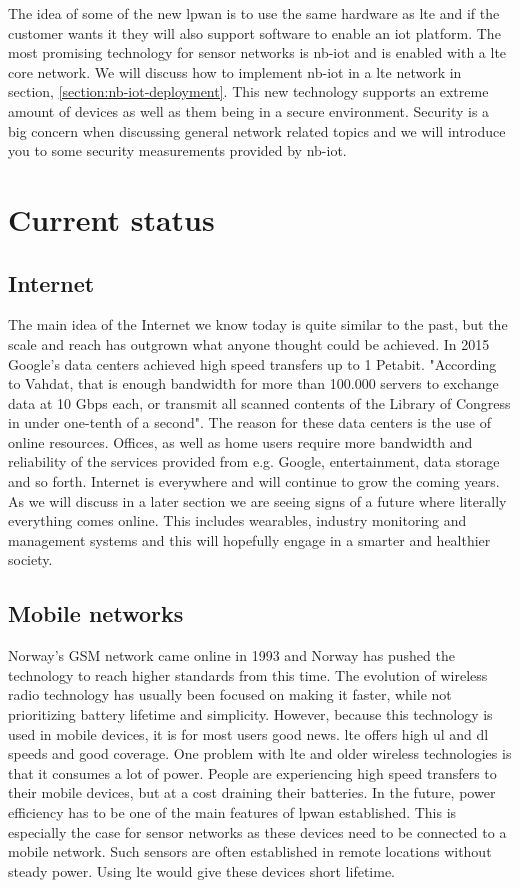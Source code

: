 \documentclass[USenglish]{ifimaster}  %
\begin{document}
The idea of some of the new \acrshort{lpwan} is to use the same hardware as \acrshort{lte} and if the customer wants it they will also support software to enable an \acrshort{iot} platform. The most promising technology for sensor networks is \acrshort{nb-iot} and is enabled with a \acrshort{lte} core network. We will discuss how to implement \acrshort{nb-iot} in a \acrshort{lte} network in section, \vref{section:nb-iot-deployment}. This new technology supports an extreme amount of devices as well as them being in a secure environment. Security is a big concern when discussing general network related topics and we will introduce you to some security measurements provided by \acrshort{nb-iot}.

\section{Current status}
\subsection{Internet}
The main idea of the Internet we know today is quite similar to the past, but the scale and reach has outgrown what anyone thought could be achieved. In 2015 Google's data centers achieved high speed transfers up to 1 Petabit. "According to Vahdat, that is enough bandwidth for more than 100.000 servers to exchange data at 10 Gbps each, or transmit all scanned contents of the Library of Congress in under one-tenth of a second"\cite{online:petabitGoogle}. The reason for these data centers is the use of online resources. Offices, as well as home users require more bandwidth and reliability of the services provided from e.g. Google, entertainment, data storage and so forth.
Internet is everywhere and will continue to grow the coming years. As we will discuss in a later section we are seeing signs of a future where literally everything comes online. This includes wearables, industry monitoring and management systems and this will hopefully engage in a smarter and healthier society.

\subsection{Mobile networks}
Norway's GSM network came online in 1993 \cite{online:gsmTelenorNetcom} and Norway has pushed the technology to reach higher standards from this time. The evolution of wireless radio technology has usually been focused on making it faster, while not prioritizing battery lifetime and simplicity. However, because this technology is used in mobile devices, it is for most users good news. \acrshort{lte} offers high \acrfull{ul} and \acrfull{dl} speeds and good coverage. One problem with \acrshort{lte} and older wireless technologies is that it consumes a lot of power. People are experiencing high speed transfers to their mobile devices, but at a cost draining their batteries. In the future, power efficiency has to be one of the main features of \acrshort{lpwan} established. This is especially the case for sensor networks as these devices need to be connected to a mobile network. Such sensors are often established in remote locations without steady power. Using \acrshort{lte} would give these devices short lifetime.
\end{document}
